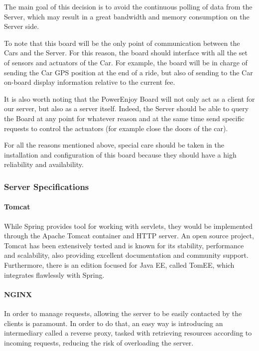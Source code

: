 \documentclass[12pt]{article}
\begin{document}
The main goal of this decision is to avoid the continuous polling of data from the Server, which may result in a great bandwidth and memory consumption on the Server side.

To note that this board will be the only point of communication between the Cars and the Server. For this reason, the board should interface with all the set of sensors and actuators of the Car. For example, the board will be in charge of sending the Car GPS position at the end of a ride, but also of sending to the Car on-board display information relative to the current fee.

It is also worth noting that the PowerEnjoy Board will not only act as a client for our server, but also as a server itself. Indeed, the Server should be able to query the Board at any point for whatever reason and at the same time send specific requests to control the actuators (for example close the doors of the car).

For all the reasons mentioned above, special care should be taken in the installation and configuration of this board because they should have a high reliability and availability.

\subsubsection{Server Specifications}
\label{server}
\paragraph{Tomcat}\label{par:tomcat}
While Spring provides tool for working with servlets, they would be implemented through the Apache Tomcat container and HTTP server. An open source project, Tomcat has been extensively tested and is known for its stability, performance and scalability, also providing excellent documentation and community support. Furthermore, there is an edition focused for Java EE, called TomEE, which integrates flawlessly with Spring.

\paragraph{NGINX}\label{par:nginx}
In order to manage requests, allowing the server to be easily contacted by the clients is paramount. In order to do that, an easy way is introducing an intermediary called a reverse proxy, tasked with retrieving resources according to incoming requests, reducing the risk of overloading the server.
\end{document}
